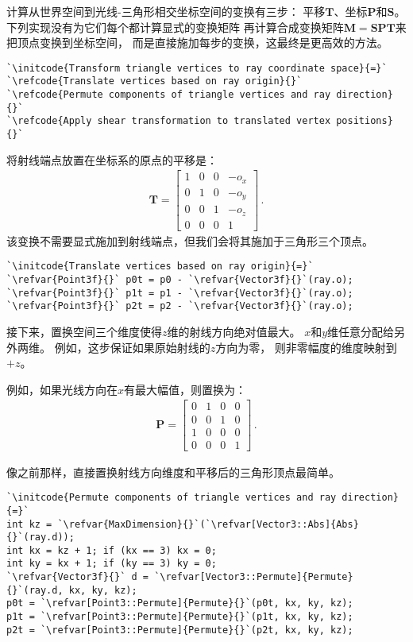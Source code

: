 计算从世界空间到光线-三角形相交坐标空间的变换有三步：
平移$\bm T$、坐标$\bm P$和$\bm S$。
下列实现没有为它们每个都计算显式的变换矩阵
再计算合成变换矩阵$\bm M=\bm S\bm P\bm T$来把顶点变换到坐标空间，
而是直接施加每步的变换，这最终是更高效的方法。
\begin{lstlisting}
`\initcode{Transform triangle vertices to ray coordinate space}{=}`
`\refcode{Translate vertices based on ray origin}{}`
`\refcode{Permute components of triangle vertices and ray direction}{}`
`\refcode{Apply shear transformation to translated vertex positions}{}`
\end{lstlisting}

将射线端点放置在坐标系的原点的平移是：
\begin{align*}
    \bm T=\left[\begin{array}{cccc}
            1 & 0 & 0 & -o_x \\
            0 & 1 & 0 & -o_y \\
            0 & 0 & 1 & -o_z \\
            0 & 0 & 0 & 1
        \end{array}\right]\, .
\end{align*}
该变换不需要显式施加到射线端点，但我们会将其施加于三角形三个顶点。
\begin{lstlisting}
`\initcode{Translate vertices based on ray origin}{=}`
`\refvar{Point3f}{}` p0t = p0 - `\refvar{Vector3f}{}`(ray.o);
`\refvar{Point3f}{}` p1t = p1 - `\refvar{Vector3f}{}`(ray.o);
`\refvar{Point3f}{}` p2t = p2 - `\refvar{Vector3f}{}`(ray.o);
\end{lstlisting}

接下来，置换空间三个维度使得$z$维的射线方向绝对值最大。
$x$和$y$维任意分配给另外两维。
例如，这步保证如果原始射线的$z$方向为零，
则非零幅度的维度映射到$+z$。

例如，如果光线方向在$x$有最大幅值，则置换为：
\begin{align*}
    \bm P=\left[\begin{array}{cccc}
            0 & 1 & 0 & 0 \\
            0 & 0 & 1 & 0 \\
            1 & 0 & 0 & 0 \\
            0 & 0 & 0 & 1
        \end{array}\right]\, .
\end{align*}

像之前那样，直接置换射线方向维度和平移后的三角形顶点最简单。
\begin{lstlisting}
`\initcode{Permute components of triangle vertices and ray direction}{=}`
int kz = `\refvar{MaxDimension}{}`(`\refvar[Vector3::Abs]{Abs}{}`(ray.d));
int kx = kz + 1; if (kx == 3) kx = 0;
int ky = kx + 1; if (ky == 3) ky = 0;
`\refvar{Vector3f}{}` d = `\refvar[Vector3::Permute]{Permute}{}`(ray.d, kx, ky, kz);
p0t = `\refvar[Point3::Permute]{Permute}{}`(p0t, kx, ky, kz);
p1t = `\refvar[Point3::Permute]{Permute}{}`(p1t, kx, ky, kz);
p2t = `\refvar[Point3::Permute]{Permute}{}`(p2t, kx, ky, kz);
\end{lstlisting}

